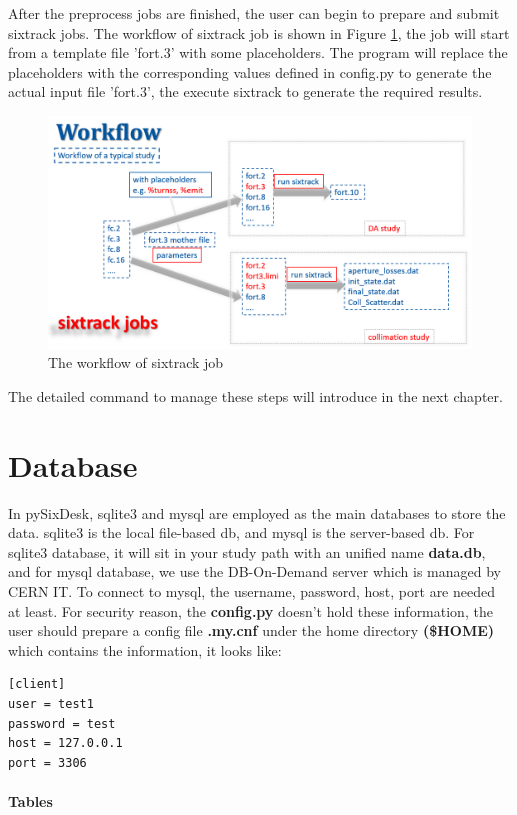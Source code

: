 After the preprocess jobs are finished, the user can begin to prepare and submit sixtrack jobs. The workflow of sixtrack job is shown in Figure \ref{fig2}, the job will start from a template file 'fort.3' with some placeholders. The program will replace the placeholders with the corresponding values defined in config.py to generate the actual input file 'fort.3', the execute sixtrack to generate the required results.
\begin{figure}[h]
\includegraphics[width=17cm]{sixtrack.png}
\caption{The workflow of sixtrack job}
\label{fig2}
\centering
\end{figure}

The detailed command to manage these steps will introduce in the next chapter.

\section{Database}

In pySixDesk, sqlite3 and mysql are employed as the main databases to store the data. sqlite3 is the local file-based db, and mysql is the server-based db. For sqlite3 database, it will sit in your study path with an unified name \textbf{data.db}, and for mysql database, we use the DB-On-Demand server which is managed by CERN IT.
  To connect to mysql, the username, password, host, port are needed at least. For security reason, the \textbf{config.py} doesn't hold these information, the user should prepare a config file \textbf{.my.cnf} under the home directory \textbf{(\$HOME)} which contains the information, it looks like:
\begin{lstlisting}
[client]
user = test1
password = test
host = 127.0.0.1
port = 3306
\end{lstlisting}

\paragraph{Tables}~

